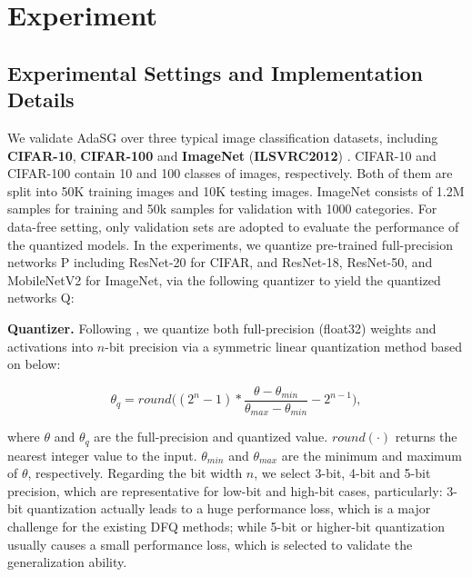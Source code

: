 
\section{Experiment}
\subsection{Experimental Settings and Implementation Details}
We validate AdaSG over three typical image classification datasets, including \textbf{CIFAR-10}, \textbf{CIFAR-100} \cite{krizhevsky2009learning} and \textbf{ImageNet} (\textbf{ILSVRC2012}) \cite{russakovsky2015imagenet}. CIFAR-10 and CIFAR-100 contain 10 and 100 classes of images, respectively. Both of them are split into 50K training images and 10K testing images. ImageNet consists of 1.2M samples for training and 50k samples for validation with 1000 categories. For data-free setting, only validation sets are adopted to evaluate the performance of the quantized models.
In the experiments, we quantize pre-trained full-precision networks P including ResNet-20 for CIFAR, and ResNet-18, ResNet-50, and MobileNetV2 for ImageNet, via the following quantizer to yield the quantized networks Q:

\noindent \textbf{Quantizer.}
Following \cite{xu2020generative,choi2021qimera}, we quantize both full-precision (float32) weights and activations into $n$-bit precision via a symmetric linear quantization method based on \cite{jacob2018quantization} below:
\begin{small}
\begin{equation}
\theta_q=round \Big ((2^n-1) * \frac{\theta-\theta_{min}}{\theta_{max}-\theta_{min}}-2^{n-1} \Big),
\end{equation}
\end{small}
where $\theta$ and $\theta_q$ are the full-precision and quantized value. $round(\cdot)$ returns the nearest integer value to the input. $\theta_{min}$ and $\theta_{max}$ are the minimum and maximum of $\theta$, respectively.
Regarding the bit width $n$, we select 3-bit, 4-bit and 5-bit precision, which are representative for low-bit and high-bit cases, particularly: 3-bit quantization actually leads to a huge performance loss, which is a major challenge for the existing DFQ methods; while 5-bit or higher-bit quantization usually causes a small performance loss, which is selected to validate the generalization ability. 

